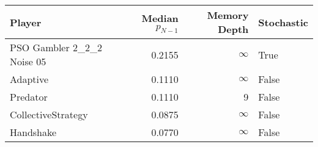 \begin{tabular}{lrrl}
\toprule
                     Player &  Median $p_{N-1}$ &  Memory Depth & Stochastic \\
\midrule
 PSO Gambler 2\_2\_2 Noise 05 &            0.2155 &            \(\infty\) &       True \\
                   Adaptive &            0.1110 &            \(\infty\) &      False \\
                   Predator &            0.1110 &             9 &      False \\
         CollectiveStrategy &            0.0875 &            \(\infty\) &      False \\
                  Handshake &            0.0770 &            \(\infty\) &      False \\
\bottomrule
\end{tabular}
